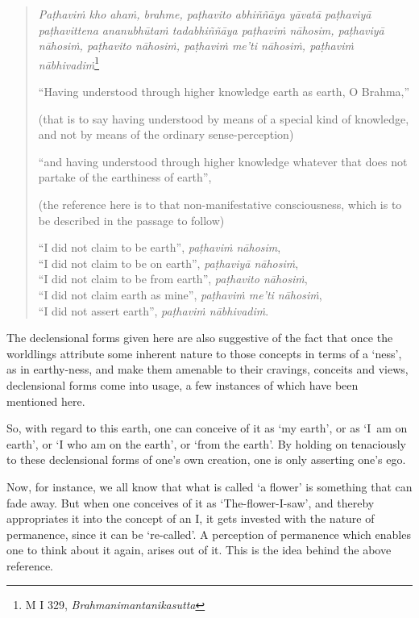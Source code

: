 \begin{quote}
\emph{Paṭhaviṁ kho ahaṁ, brahme, paṭhavito abhiññāya yāvatā paṭhaviyā paṭhavittena ananubhūtaṁ tadabhiññāya paṭhaviṁ nāhosim, paṭhaviyā nāhosiṁ, paṭhavito nāhosiṁ, paṭhaviṁ me'ti nāhosiṁ, paṭhaviṁ nābhivadiṁ}\footnote{M I 329, \emph{Brahmanimantanikasutta}}

``Having understood through higher knowledge earth as earth, O Brahma,''

(that is to say having understood by means of a special kind of knowledge, and not by means of the ordinary sense-perception)

``and having understood through higher knowledge whatever that does not partake of the earthiness of earth'',

(the reference here is to that non-manifestative consciousness, which is to be described in the passage to follow)

``I did not claim to be earth'', \emph{paṭhaviṁ nāhosim},\\
``I did not claim to be on earth'', \emph{paṭhaviyā nāhosiṁ},\\
``I did not claim to be from earth'', \emph{paṭhavito nāhosiṁ},\\
``I did not claim earth as mine'', \emph{paṭhaviṁ me'ti nāhosiṁ},\\
``I did not assert earth'', \emph{paṭhaviṁ nābhivadiṁ}.
\end{quote}

The declensional forms given here are also suggestive of the fact that once the worldlings attribute some inherent nature to those concepts in terms of a `ness', as in earthy-ness, and make them amenable to their cravings, conceits and views, declensional forms come into usage, a few instances of which have been mentioned here.

So, with regard to this earth, one can conceive of it as `my earth', or as `I~am on earth', or `I who am on the earth', or `from the earth'. By holding on tenaciously to these declensional forms of one's own creation, one is only asserting one's ego.

Now, for instance, we all know that what is called `a flower' is something that can fade away. But when one conceives of it as `The-flower-I-saw', and thereby appropriates it into the concept of an I, it gets invested with the nature of permanence, since it can be `re-called'. A perception of permanence which enables one to think about it again, arises out of it. This is the idea behind the above reference.


